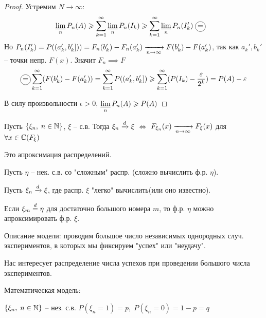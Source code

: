 \begin{theorem}
\begin{proof}
    Устремим $N \to \infty:$
    \begin{align*}
      &\limdown_n P_n(A) \geq \sum_{k = 1}^{\infty} \limdown_n P_n(I_k) 
      \geq \sum_{k = 1}^{\infty} \limdown_n P_n(I_k') \;
      \circled{=} 
    \end{align*}
    Но $P_n(I_k') = P((a_k', b_k'])) = F_n(b_k') - F_n(a_k')
    \xrightarrow[n \to \infty]{} F(b_k') - F(a_k')$, 
    так как $a_k', b_k'$ -- точки непр. $F(x)$. Значит $F_n \implies F$
    \begin{align*}
      \circled{=} \sum_{k = 1}^{\infty} (F(b_k') - F(a_k')) 
      = \sum_{k = 1}^{\infty} P((a_k', b_k']) 
      \geq \sum_{k = 1}^{\infty} (P(I_k) - \frac{\epsilon}{2^k}) = P(A) - \epsilon
    \end{align*}

    В силу произвольности $\epsilon > 0$, $\varliminf\limits_n P_n(A) \geqslant P(A)$

  \end{proof}

\end{theorem}

\begin{corollary}
  Пусть $\{ \xi_n,\; n \in \mathbb{N} \}$, $\xi$ -- с.в. 
  Тогда $\xi_n \xrightarrow{d} \xi$
  $\iff$ $F_{\xi_n}(x) \xrightarrow[n \to \infty]{} F_{\xi} (x)$ 
  для $\forall x \in \mathbb{C} (F_\xi)$\\
\end{corollary}

 
Это апроксимация распределений.

Пусть $\eta$ -- нек. с.в. со "сложным" распр. (сложно вычислить ф.р. $\eta$). 

Пусть $\xi_n \xrightarrow{d} \xi$, где распр. $\xi$ "легко" вычислить(или оно известно). 

Если $\xi_m \stackrel{d}{=} \eta$ для достаточно большого номера $m$, 
то ф.р. $\eta$ можно апроксимировать ф.р. $\xi$.\\


Описание модели: проводим большое число независимых однородных случ. экспериментов, в которых мы фиксируем "успех" или "неудачу".

Нас интересует распределение числа успехов при проведении большого числа экспериментов.

Математическая модель:

$\{ \xi_n,\; n \in \mathbb{N} \}$ -- нез. с.в.
$P(\xi_n = 1) = p,\; P(\xi_n = 0) = 1 - p = q$


